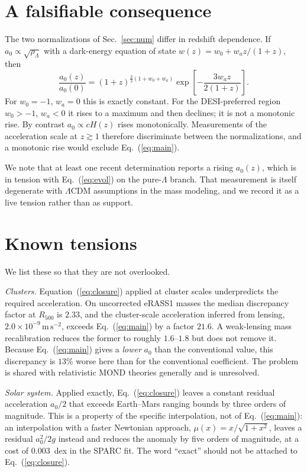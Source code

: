 \documentclass[aps,prd,reprint,amsmath,amssymb,nofootinbib,superscriptaddress]{revtex4-2}
\begin{document}
\section{A falsifiable consequence}
\label{sec:test}

The two normalizations of Sec.~\ref{sec:num} differ in redshift dependence. If
$a_0\propto\sqrt{\rho_\Lambda}$ with a dark-energy equation of state
$w(z) = w_0 + w_a z/(1+z)$, then
\begin{equation}
\frac{a_0(z)}{a_0(0)} = (1+z)^{\frac32(1+w_0+w_a)}\exp\!\left[-\frac{3w_a z}{2(1+z)}\right].
\label{eq:evol}
\end{equation}
For $w_0=-1$, $w_a=0$ this is exactly constant. For the DESI-preferred region $w_0>-1$, $w_a<0$ it
rises to a maximum and then declines; it is not a monotonic rise. By contrast $a_0\propto cH(z)$ rises
monotonically. Measurements of the acceleration scale at $z\gtrsim1$ therefore discriminate between the
normalizations, and a monotonic rise would exclude Eq.~(\ref{eq:main}).

We note that at least one recent determination reports a rising $a_0(z)$, which is in tension with
Eq.~(\ref{eq:evol}) on the pure-$\Lambda$ branch. That measurement is itself degenerate with
$\Lambda$CDM assumptions in the mass modeling, and we record it as a live tension rather than as
support.

\section{Known tensions}

We list these so that they are not overlooked.

\emph{Clusters.} Equation~(\ref{eq:closure}) applied at cluster scales underpredicts the required
acceleration. On uncorrected eRASS1 masses the median discrepancy factor at $R_{500}$ is $2.33$, and the
cluster-scale acceleration inferred from lensing, $2.0\times10^{-9}\,\mathrm{m\,s^{-2}}$, exceeds
Eq.~(\ref{eq:main}) by a factor $21.6$. A weak-lensing mass recalibration reduces the former to roughly
$1.6$--$1.8$ but does not remove it. Because Eq.~(\ref{eq:main}) gives a \emph{lower} $a_0$ than the
conventional value, this discrepancy is $13\%$ worse here than for the conventional coefficient. The
problem is shared with relativistic MOND theories generally and is unresolved.

\emph{Solar system.} Applied exactly, Eq.~(\ref{eq:closure}) leaves a constant residual acceleration
$a_0/2$ that exceeds Earth--Mars ranging bounds by three orders of magnitude. This is a property of the
specific interpolation, not of Eq.~(\ref{eq:main}): an interpolation with a faster Newtonian approach,
$\mu(x) = x/\sqrt{1+x^2}$, leaves a residual $a_0^2/2g$ instead and reduces the anomaly by five orders
of magnitude, at a cost of $0.003$~dex in the SPARC fit. The word ``exact'' should not be attached to
Eq.~(\ref{eq:closure}).
\end{document}

